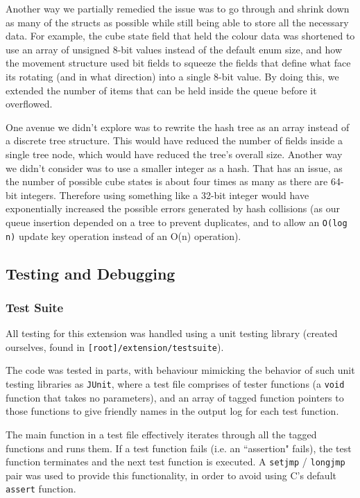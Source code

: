 \documentclass[8pt]{article}
\begin{document}
Another way we partially remedied the issue was to go through and shrink down as many of the structs as possible
while still being able to store all the necessary data.
For example, the cube state field that held the colour data was shortened to use an array of unsigned
8-bit values instead of the default enum size, and how the movement structure used bit fields to squeeze
the fields that define what face its rotating (and in what direction) into a single 8-bit value.
By doing this, we extended the number of items that can be held inside the queue before it overflowed.

One avenue we didn't explore was to rewrite the hash tree as an array instead of a discrete tree structure.
This would have reduced the number of fields inside a single tree node, which would have reduced the tree's overall size.
Another way we didn't consider was to use a smaller integer as a hash. That has an issue, as the number of possible cube states
is about four times as many as there are 64-bit integers. Therefore using something like a 32-bit integer would have exponentially
increased the possible errors generated by hash collisions (as our queue insertion depended on a tree to prevent duplicates, and to
allow an \texttt{O(log n)} update key operation instead of an O(n) operation).

\subsection{Testing and Debugging}

\subsubsection{Test Suite}

All testing for this extension was handled using a unit testing library (created ourselves, found in \texttt{[root]/extension/testsuite}).

The code was tested in parts, with behaviour mimicking the behavior of such unit testing libraries as \texttt{JUnit}, where a test file comprises of tester functions (a \texttt{void} function that takes no parameters), and an array of tagged function pointers to those functions to give friendly names in the output log for each test function.

The main function in a test file effectively iterates through all the tagged functions and runs them.
If a test function fails (i.e. an ``assertion" fails), the test function terminates and the next test function is executed.
A \texttt{setjmp} / \texttt{longjmp} pair was used to provide this functionality, in order to avoid using C's default \texttt{assert} function.
\end{document}
